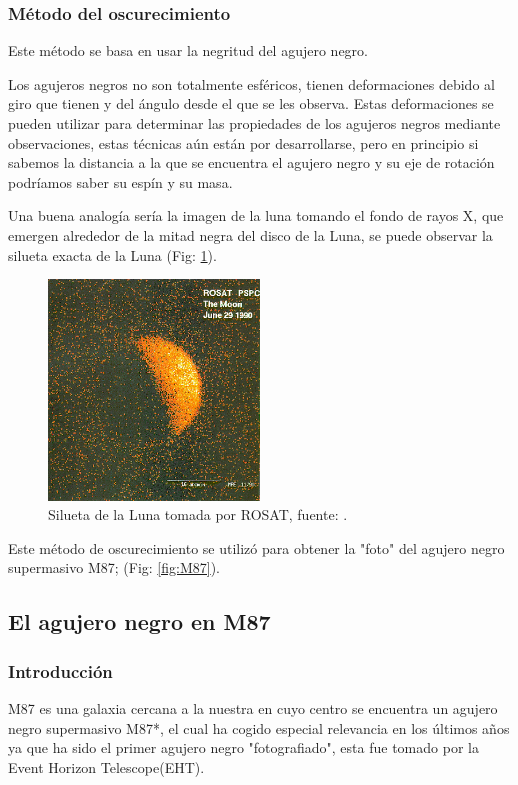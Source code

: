 \documentclass{article}
\begin{document}
\subsubsection{Método del oscurecimiento}
Este método se basa en usar la negritud del agujero negro.\cite{muller2007experimental}

Los agujeros negros no son totalmente esféricos, tienen deformaciones debido al giro que tienen y del ángulo desde el que se les observa. Estas deformaciones se pueden utilizar para determinar las propiedades de los agujeros negros mediante observaciones, estas técnicas aún están por desarrollarse, pero en principio si sabemos la distancia a la que se encuentra el agujero negro y su eje de rotación podríamos saber su espín y su masa.\cite{muller2007experimental}

Una buena analogía sería la imagen de la luna tomando el fondo de rayos X, que emergen alrededor de la mitad negra del disco de la Luna, se puede observar la silueta exacta de la Luna (Fig: \ref{fig:Luna Rosat}).\cite{muller2007experimental}

\begin{figure}[H]
    \centering
    \includegraphics[width=0.5\textwidth]{Luna_ROSAT.png}
    \caption{Silueta de la Luna tomada por ROSAT, fuente: \cite{muller2007experimental}.}
    \label{fig:Luna Rosat}
\end{figure}

Este método de oscurecimiento se utilizó para obtener la "foto" del agujero negro supermasivo M87; (Fig: \ref{fig:M87}).

\subsection{El agujero negro en M87}

\subsubsection{Introducción}
M87 es una galaxia cercana a la nuestra en cuyo centro se encuentra un agujero negro supermasivo M87*, el cual ha cogido especial relevancia en los últimos años ya que ha sido el primer agujero negro "fotografiado", esta fue tomado por la Event Horizon Telescope(EHT).
\end{document}
